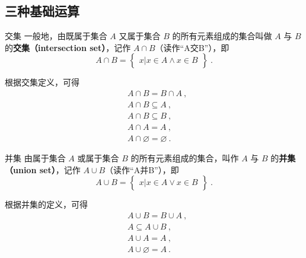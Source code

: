 
\begin{issues}
\issueDraft
\end{issues}

\subsection{三种基础运算}
\begin{definition}{交集}
一般地，由既属于集合 $A$ 又属于集合 $B$ 的所有元素组成的集合叫做 $A$ 与 $B$ 的\textbf{交集（intersection set）}，记作 $A \cap B$（读作“A交B”），即
\begin{equation}
A\cap B = \begin{Bmatrix} x|x\in A \wedge x\in B \end{Bmatrix}~.
\end{equation}
\end{definition}

根据交集定义，可得
\begin{equation}
\begin{aligned}
&A\cap B = B\cap A~, \\ 
&A\cap B \subseteq A ~,\\
&A\cap B \subseteq B~, \\
&A\cap A = A ~,\\
&A\cap \varnothing = \varnothing~.
\end{aligned}
\end{equation}

\begin{definition}{并集}
由属于集合 $A$ 或属于集合 $B$ 的所有元素组成的集合，叫作 $A$ 与 $B$ 的\textbf{并集（union set）}，记作 $A\cup B$（读作“A并B”），即
\begin{equation}
A\cup B = \begin{Bmatrix}x|x\in A \vee x\in B\end{Bmatrix}~.
\end{equation}
\end{definition}

根据并集的定义，可得
\begin{equation}
\begin{aligned}
&A\cup B = B\cup A~, \\
&A\subseteq A\cup B ~,\\
&A\cup A = A ~,\\
&A\cup \varnothing = A~.
\end{aligned}
\end{equation}
